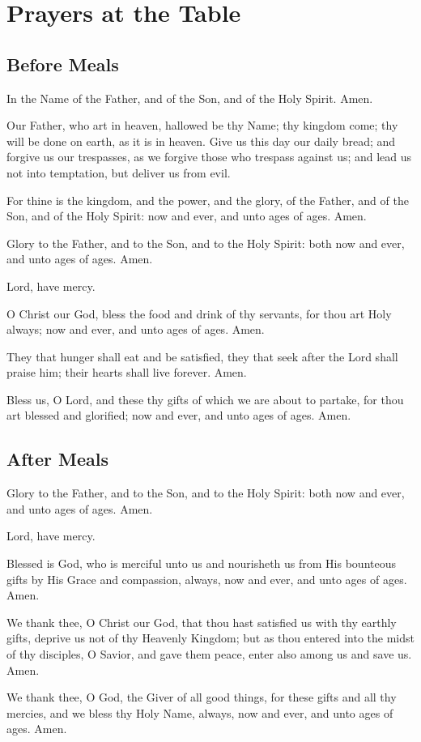 \section{Prayers at the Table}

\subsection{Before Meals}

In the Name of the Father, and of the Son, and of the Holy Spirit. Amen.

Our Father, who art in heaven, hallowed be thy Name; thy kingdom come; thy will be done on earth, as it is in heaven. Give us this day our daily bread; and forgive us our trespasses, as we forgive those who trespass against us; and lead us not into temptation, but deliver us from evil.

For thine is the kingdom, and the power, and the glory, of the Father, and of the Son, and of the Holy Spirit: now and ever, and unto ages of ages. Amen.

Glory to the Father, and to the Son, and to the Holy Spirit: both now and ever, and unto ages of ages. Amen.

Lord, have mercy. 


    O Christ our God, bless the food and drink of thy servants, for thou art Holy always; now and ever, and unto ages of ages. Amen.


    They that hunger shall eat and be satisfied, they that seek after the Lord shall praise him; their hearts shall live forever. Amen.


    Bless us, O Lord, and these thy gifts of which we are about to partake, for thou art blessed and glorified; now and ever, and unto ages of ages. Amen.

\subsection{After Meals}

Glory to the Father, and to the Son, and to the Holy Spirit: both now and ever, and unto ages of ages. Amen.

Lord, have mercy. 


    Blessed is God, who is merciful unto us and nourisheth us from His bounteous gifts by His Grace and compassion, always, now and ever, and unto ages of ages. Amen.


    We thank thee, O Christ our God, that thou hast satisfied us with thy earthly gifts, deprive us not of thy Heavenly Kingdom; but as thou entered into the midst of thy disciples, O Savior, and gave them peace, enter also among us and save us. Amen.


    We thank thee, O God, the Giver of all good things, for these gifts and all thy mercies, and we bless thy Holy Name, always, now and ever, and unto ages of ages. Amen.

\cleardoublepage
